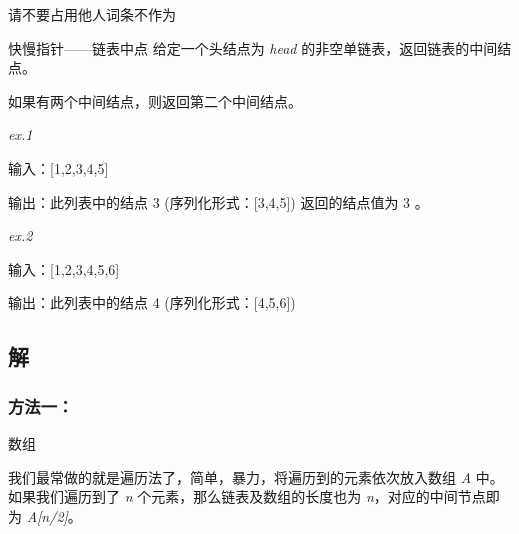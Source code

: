 
\begin{issues}
\issueDraft 请不要占用他人词条不作为
\end{issues}

\begin{example}{快慢指针——链表中点}
给定一个头结点为 \textsl{head} 的非空单链表，返回链表的中间结点。

如果有两个中间结点，则返回第二个中间结点。

\textsl{ex.1}

输入：[1,2,3,4,5] 

输出：此列表中的结点 3 (序列化形式：[3,4,5])
返回的结点值为 3 。

\textsl{ex.2}

输入：[1,2,3,4,5,6]

输出：此列表中的结点 4 (序列化形式：[4,5,6])
\end{example}

\subsection{解}
\subsubsection{方法一：}
数组

我们最常做的就是遍历法了，简单，暴力，将遍历到的元素依次放入数组 \textsl{A }中。如果我们遍历到了 \textsl{n }个元素，那么链表及数组的长度也为 \textsl{n}，对应的中间节点即为 \textsl{A[n/2]}。

